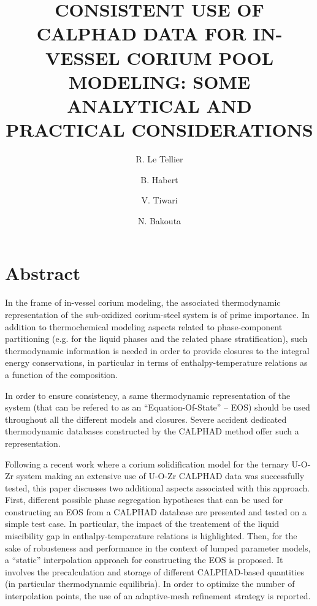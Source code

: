 \documentclass[11pt]{article}\usepackage{geometry} \geometry{letterpaper, margin=25.4mm}
\begin{document}
\title{\vspace{-1em}\bf \MakeUppercase{Consistent use of CALPHAD data for in-vessel corium pool modeling: some analytical and practical considerations}}
\date{}

\author{R. Le Tellier}
\author{B. Habert}  
\author{V. Tiwari}  
\author{N. Bakouta}

\maketitle

\thispagestyle{fancy}

\setlength{\parskip}{0em}
\section*{Abstract}
In the frame of in-vessel corium modeling, the associated thermodynamic representation of the sub-oxidized corium-steel system is of prime importance. In addition to thermochemical modeling aspects related to phase-component partitioning (e.g. for the liquid phases and the related phase stratification), such thermodynamic information is needed in order to provide closures to the integral energy conservations, in particular in terms of enthalpy-temperature relations as a function of the composition.

In order to ensure consistency, a same thermodynamic representation of the system (that can be refered to as an ``Equation-Of-State'' -- EOS) should be used throughout all the different models and closures. Severe accident dedicated thermodynamic databases constructed by the CALPHAD method offer such a representation.

Following a recent work where a corium solidification model for the ternary U-O-Zr system making an extensive use of U-O-Zr CALPHAD data was successfully tested, this paper discusses two additional aspects associated with this approach. First, different possible phase segregation hypotheses that can be used for constructing an EOS from a CALPHAD database are presented and tested on a simple test case. In particular, the impact of the treatement of the liquid miscibility gap in enthalpy-temperature relations is highlighted. Then, for the sake of robusteness and performance in the context of lumped parameter models, a ``static'' interpolation approach for constructing the EOS is proposed. It involves the precalculation and storage of different CALPHAD-based quantities (in particular thermodynamic equilibria). In order to optimize the number of interpolation points, the use of an adaptive-mesh refinement strategy is reported.
\end{document}
